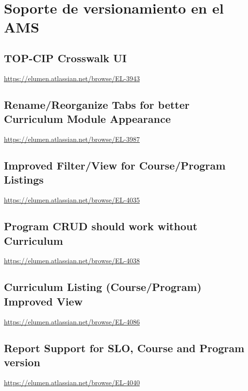 \section{Soporte de versionamiento en el AMS}
\subsection{TOP-CIP Crosswalk UI}
\url{https://elumen.atlassian.net/browse/EL-3943}

\subsection{Rename/Reorganize Tabs for better Curriculum Module Appearance}
\url{https://elumen.atlassian.net/browse/EL-3987}

\subsection{Improved Filter/View for Course/Program Listings}
\url{https://elumen.atlassian.net/browse/EL-4035}

\subsection{Program CRUD should work without Curriculum}
\url{https://elumen.atlassian.net/browse/EL-4038}

\subsection{Curriculum Listing (Course/Program) Improved View}
\url{https://elumen.atlassian.net/browse/EL-4086}

\subsection{Report Support for SLO, Course and Program version}
\url{https://elumen.atlassian.net/browse/EL-4040}